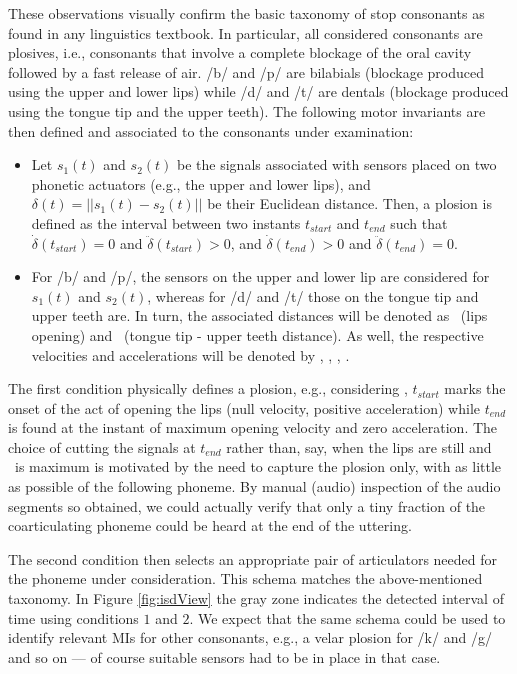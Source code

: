 These observations visually confirm the basic taxonomy of stop consonants 
as found in any linguistics textbook. In particular, all considered consonants are plosives,
i.e., consonants that involve a complete blockage of the oral cavity followed by a fast
release of air. /b/ and /p/ are bilabials (blockage produced using the upper and lower lips)
while /d/ and /t/ are dentals (blockage produced using the tongue tip and the upper teeth).
The following motor invariants are then defined and associated to the consonants under
examination:

\begin{itemize}

  \item Let $s_1(t)$ and $s_2(t)$ be the signals associated
    with sensors placed on two phonetic actuators (e.g., the upper and
    lower lips), and $\delta(t) = ||s_1(t)-s_2(t)||$ be their
    Euclidean distance. Then, a plosion is defined as the interval
    between two instants $t_{start}$ and $t_{end}$ such that
    $\dot{\delta}(t_{start}) = 0 $ and $\ddot{\delta}(t_{start}) > 0$,
    and $\dot{\delta}(t_{end}) > 0 $ and $\ddot{\delta}(t_{end}) = 0$.

  \item For /b/ and /p/, the sensors on the upper and lower
    lip are considered for $s_1(t)$ and $s_2(t)$, whereas for /d/ and /t/
    those on the tongue tip and upper teeth are. In turn, the associated
    distances will be denoted as \lio\ (lips opening) and \ttu\
    (tongue tip - upper teeth distance). As well, the respective velocities
    and accelerations will be denoted by \vlio, \vttu, \alio, \attu.

\end{itemize}

The first condition physically defines a plosion, e.g., considering \lio, $t_{start}$
marks the onset of the act of opening the lips (null velocity, positive acceleration)
while $t_{end}$ is found at the instant of maximum opening velocity and zero acceleration.
The choice of cutting the signals at $t_{end}$ rather than, say, when the lips are still
and \lio\ is maximum is motivated by the need to capture the plosion only, with as little
as possible of the following phoneme. By manual (audio) inspection of the audio segments so
obtained, we could actually verify that only a tiny fraction of the coarticulating phoneme
could be heard at the end of the uttering.

The second condition then selects an appropriate pair of articulators needed for the
phoneme under consideration. This schema matches the above-mentioned taxonomy. In Figure
\ref{fig:isdView} the gray zone indicates the detected interval of time using conditions
$1$ and $2$. We expect that the same schema could be used to identify relevant MIs for
other consonants, e.g., a velar plosion for /k/ and /g/ and so on --- of course suitable 
sensors had to be in place in that case.

